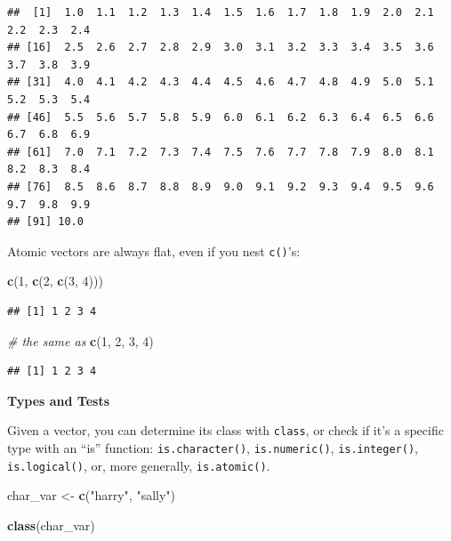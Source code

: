 \documentclass[
]{book}
\newenvironment{Shaded}{\begin{snugshade}}{\end{snugshade}}
\newcommand{\CommentTok}[1]{\textcolor[rgb]{0.56,0.35,0.01}{\textit{#1}}}
\newcommand{\DecValTok}[1]{\textcolor[rgb]{0.00,0.00,0.81}{#1}}
\newcommand{\FunctionTok}[1]{\textcolor[rgb]{0.13,0.29,0.53}{\textbf{#1}}}
\newcommand{\NormalTok}[1]{#1}
\newcommand{\OtherTok}[1]{\textcolor[rgb]{0.56,0.35,0.01}{#1}}
\newcommand{\StringTok}[1]{\textcolor[rgb]{0.31,0.60,0.02}{#1}}
\begin{document}
\begin{verbatim}
##  [1]  1.0  1.1  1.2  1.3  1.4  1.5  1.6  1.7  1.8  1.9  2.0  2.1  2.2  2.3  2.4
## [16]  2.5  2.6  2.7  2.8  2.9  3.0  3.1  3.2  3.3  3.4  3.5  3.6  3.7  3.8  3.9
## [31]  4.0  4.1  4.2  4.3  4.4  4.5  4.6  4.7  4.8  4.9  5.0  5.1  5.2  5.3  5.4
## [46]  5.5  5.6  5.7  5.8  5.9  6.0  6.1  6.2  6.3  6.4  6.5  6.6  6.7  6.8  6.9
## [61]  7.0  7.1  7.2  7.3  7.4  7.5  7.6  7.7  7.8  7.9  8.0  8.1  8.2  8.3  8.4
## [76]  8.5  8.6  8.7  8.8  8.9  9.0  9.1  9.2  9.3  9.4  9.5  9.6  9.7  9.8  9.9
## [91] 10.0
\end{verbatim}

Atomic vectors are always flat, even if you nest \texttt{c()}'s:

\begin{Shaded}
\begin{Highlighting}[]
\FunctionTok{c}\NormalTok{(}\DecValTok{1}\NormalTok{, }\FunctionTok{c}\NormalTok{(}\DecValTok{2}\NormalTok{, }\FunctionTok{c}\NormalTok{(}\DecValTok{3}\NormalTok{, }\DecValTok{4}\NormalTok{)))}
\end{Highlighting}
\end{Shaded}

\begin{verbatim}
## [1] 1 2 3 4
\end{verbatim}

\begin{Shaded}
\begin{Highlighting}[]
\CommentTok{\# the same as}
\FunctionTok{c}\NormalTok{(}\DecValTok{1}\NormalTok{, }\DecValTok{2}\NormalTok{, }\DecValTok{3}\NormalTok{, }\DecValTok{4}\NormalTok{)}
\end{Highlighting}
\end{Shaded}

\begin{verbatim}
## [1] 1 2 3 4
\end{verbatim}

\textbf{Types and Tests}

Given a vector, you can determine its class with \texttt{class}, or check if it's a specific type with an ``is'' function: \texttt{is.character()}, \texttt{is.numeric()}, \texttt{is.integer()}, \texttt{is.logical()}, or, more generally, \texttt{is.atomic()}.

\begin{Shaded}
\begin{Highlighting}[]
\NormalTok{char\_var }\OtherTok{\textless{}{-}} \FunctionTok{c}\NormalTok{(}\StringTok{"harry"}\NormalTok{, }\StringTok{"sally"}\NormalTok{)}

\FunctionTok{class}\NormalTok{(char\_var)}
\end{Highlighting}
\end{Shaded}
\end{document}
